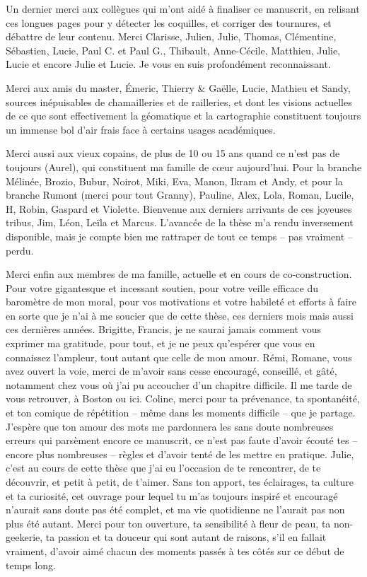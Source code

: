 Un dernier merci aux collègues qui m'ont aidé à finaliser ce manuscrit, en relisant ces longues pages pour y détecter les coquilles, et corriger des tournures, et débattre de leur contenu.
Merci Clarisse, Julien, Julie, Thomas, Clémentine, Sébastien, Lucie, Paul C. et Paul G., Thibault, Anne-Cécile, Matthieu, Julie, Lucie et encore Julie et Lucie.
Je vous en suis profondément reconnaissant.

Merci aux amis du master, Émeric, Thierry \& Gaëlle, Lucie, Mathieu et Sandy, sources inépuisables de chamailleries et de railleries, et dont les visions actuelles de ce que sont effectivement la géomatique et la cartographie constituent toujours un immense bol d'air frais face à certains usages académiques.

Merci aussi aux vieux copains, de plus de 10 ou 15 ans quand ce n'est pas de toujours (Aurel), qui constituent ma famille de cœur aujourd'hui.
Pour la branche Mélinée, Brozio, Bubur, Noirot, Miki, Eva, Manon, Ikram et Andy, et pour la branche Rumont (merci pour tout Granny), Pauline, Alex, Lola, Roman, Lucile, H, Robin, Gaspard et Violette.
Bienvenue aux derniers arrivants de ces joyeuses tribus, Jim, Léon, Leïla et Marcus.
L'avancée de la thèse m'a rendu inversement disponible, mais je compte bien me rattraper de tout ce temps -- pas vraiment -- perdu.

Merci enfin aux membres de ma famille, actuelle et en cours de co-construction.
Pour votre gigantesque et incessant soutien, pour votre veille efficace du baromètre de mon moral, pour vos motivations et votre habileté et efforts à faire en sorte que je n'ai à me soucier que de cette thèse, ces derniers mois mais aussi ces dernières années.
Brigitte, Francis, je ne saurai jamais comment vous exprimer ma gratitude, pour tout, et je ne peux qu'espérer que vous en connaissez l'ampleur, tout autant que celle de mon amour.
Rémi, Romane, vous avez ouvert la voie, merci de m'avoir sans cesse encouragé, conseillé, et gâté, notamment chez vous où j'ai pu accoucher d'un chapitre difficile.
Il me tarde de vous retrouver, à Boston ou ici.
Coline, merci pour ta prévenance, ta spontanéité, et ton comique de répétition -- même dans les moments difficile -- que je partage.
J'espère que ton amour des mots me pardonnera les sans doute nombreuses erreurs qui parsèment encore ce manuscrit, ce n'est pas faute d'avoir écouté tes -- encore plus nombreuses -- règles et d'avoir tenté de les mettre en pratique.
Julie, c'est au cours de cette thèse que j'ai eu l'occasion de te rencontrer, de te découvrir, et petit à petit, de t'aimer.
Sans ton apport, tes éclairages, ta culture et ta curiosité, cet ouvrage pour lequel tu m'as toujours inspiré et encouragé n'aurait sans doute pas été complet, et ma vie quotidienne ne l'aurait pas non plus été autant.
Merci pour ton ouverture, ta sensibilité à fleur de peau, ta \og non-geekerie\fg{}, ta passion et ta douceur qui sont autant de raisons, s'il en fallait vraiment, d'avoir aimé chacun des moments passés à tes côtés sur ce début de temps long.
